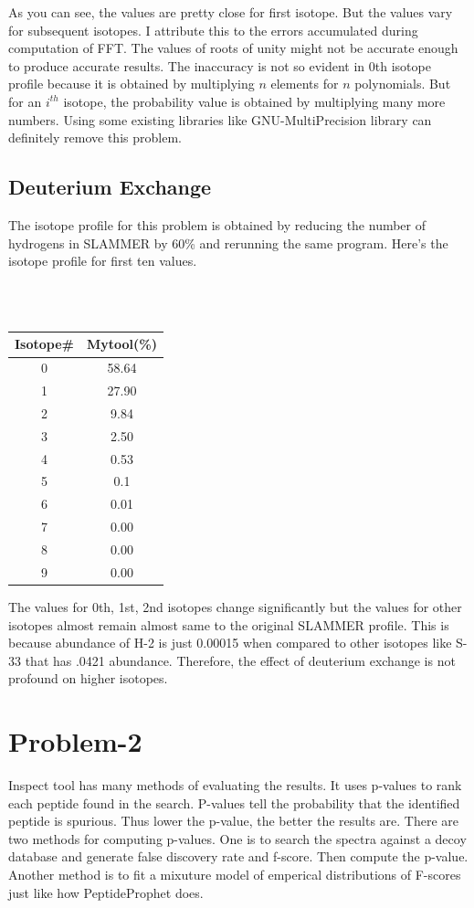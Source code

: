 \documentclass{article}
\begin{document}
As you can see, the values are pretty close for first isotope. But the values vary for subsequent isotopes. I attribute this to the errors accumulated during computation of FFT. The values of roots of unity might not be accurate enough to produce accurate results. The inaccuracy is not so evident in 0th isotope profile because it is obtained by multiplying $n$ elements for $n$ polynomials. But for an $i^{th}$ isotope, the probability value is obtained by multiplying many more numbers. Using some existing libraries like GNU-MultiPrecision library can definitely remove this problem. 

\subsection{Deuterium Exchange}
The isotope profile for this problem is obtained by reducing the number of hydrogens in SLAMMER by 60\% and rerunning the same program.  Here's the isotope profile for first ten values.

\ \\ \\ 

\begin{tabular}{|c|c|}
\hline
Isotope\# &  Mytool(\%) \\ \hline
0 & 58.64\\ \hline
1 & 27.90\\ \hline
2 & 9.84\\ \hline
3 & 2.50\\ \hline
4 & 0.53\\ \hline
5 & 0.1\\ \hline
6 & 0.01\\ \hline
7 & 0.00\\ \hline
8 & 0.00\\ \hline
9 & 0.00\\ \hline
\end{tabular}


The values for 0th, 1st, 2nd isotopes change significantly but the values for other isotopes almost remain almost same to the original SLAMMER profile. This is because abundance of H-2 is just 0.00015 when compared to other isotopes like S-33 that has .0421 abundance. Therefore, the effect of deuterium exchange is not profound on higher isotopes.

\section{Problem-2}
Inspect tool has many methods of evaluating the results. It uses p-values to rank each peptide found in the search. P-values tell the probability that the identified peptide is spurious. Thus lower the p-value, the better the results are. There are two methods for computing p-values. One is to search the spectra against a decoy database and generate false discovery rate and f-score. Then compute the p-value. Another method is to fit a mixuture model of emperical distributions of F-scores just like how PeptideProphet does.
\end{document}
